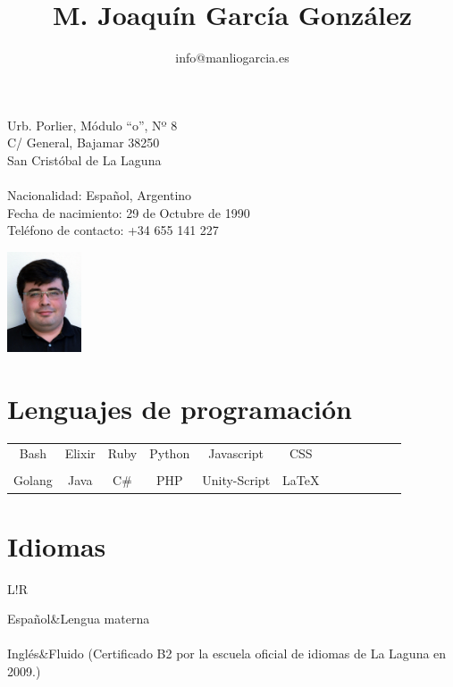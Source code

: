 \documentclass[10pt]{article}
\title{\bfseries M. Joaquín García González}
\author{info@manliogarcia.es}
\date{}
\newcommand\VRule{\color{lightgray}\vrule width 0.5pt}
\begin{document}

    \maketitle

    \begin{minipage}[ht]{0.48\textwidth}
        Urb. Porlier, Módulo ``o'', Nº 8\\
        C/ General, Bajamar 38250\\
        San Cristóbal de La Laguna\\
        \\
        Nacionalidad: Español, Argentino\\
        Fecha de nacimiento: 29 de Octubre de 1990\\
        Teléfono de contacto: +34 655 141 227
    \end{minipage}
    \begin{minipage}[ht]{0.48\textwidth}
        \begin{flushright}
        \includegraphics[height=8em]{profile}
        \end{flushright}
    \end{minipage}

    \section*{Lenguajes de programación}
    \begin{center}
    \begin{tabular}{ c c c c c c c c c c c c }

      Bash & Elixir & Ruby & Python & Javascript & CSS \\\\

         Golang & Java & C\# & PHP & Unity-Script & \LaTeX

    \end{tabular}
    \end{center}

    \section*{Idiomas}
    \begin{tabular}{L!{\VRule}R}

        Español&Lengua materna\\\\

        Inglés&Fluido (Certificado B2 por la escuela oficial de idiomas de La Laguna en 2009.)\\\\

    \end{tabular}
\end{document}
